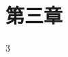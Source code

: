 \documentclass[supercite]{upcthesis}
\begin{document}
\fi

\section{第三章}

3





\ifx\compileAllFiles\undefined
\end{document}
